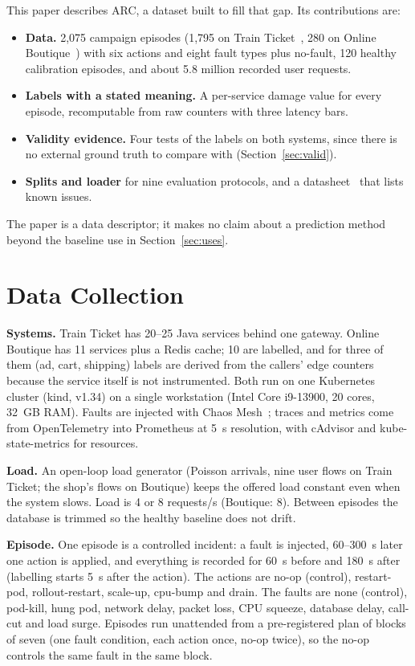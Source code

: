 \documentclass[10pt,conference]{IEEEtran}
\begin{document}
This paper describes ARC, a dataset built to fill that gap. Its contributions are:
\begin{itemize}
\item \textbf{Data.} 2{,}075 campaign episodes (1{,}795 on Train Ticket~\cite{trainticket}, 280 on Online Boutique~\cite{boutique}) with six actions and eight fault types plus no-fault, 120 healthy calibration episodes, and about 5.8 million recorded user requests.
\item \textbf{Labels with a stated meaning.} A per-service damage value for every episode, recomputable from raw counters with three latency bars.
\item \textbf{Validity evidence.} Four tests of the labels on both systems, since there is no external ground truth to compare with (Section~\ref{sec:valid}).
\item \textbf{Splits and loader} for nine evaluation protocols, and a datasheet~\cite{gebru} that lists known issues.
\end{itemize}
The paper is a data descriptor; it makes no claim about a prediction method beyond the baseline use in Section~\ref{sec:uses}.

\section{Data Collection}
\textbf{Systems.} Train Ticket has 20--25 Java services behind one gateway. Online Boutique has 11 services plus a Redis cache; 10 are labelled, and for three of them (ad, cart, shipping) labels are derived from the callers' edge counters because the service itself is not instrumented. Both run on one Kubernetes cluster (kind, v1.34) on a single workstation (Intel Core i9-13900, 20 cores, 32~GB RAM). Faults are injected with Chaos Mesh~\cite{chaosmesh}; traces and metrics come from OpenTelemetry into Prometheus at 5~s resolution, with cAdvisor and kube-state-metrics for resources.

\textbf{Load.} An open-loop load generator (Poisson arrivals, nine user flows on Train Ticket; the shop's flows on Boutique) keeps the offered load constant even when the system slows. Load is 4 or 8 requests/s (Boutique: 8). Between episodes the database is trimmed so the healthy baseline does not drift.

\textbf{Episode.} One episode is a controlled incident: a fault is injected, 60--300~s later one action is applied, and everything is recorded for 60~s before and 180~s after (labelling starts 5~s after the action). The actions are no-op (control), restart-pod, rollout-restart, scale-up, cpu-bump and drain. The faults are none (control), pod-kill, hung pod, network delay, packet loss, CPU squeeze, database delay, call-cut and load surge. Episodes run unattended from a pre-registered plan of blocks of seven (one fault condition, each action once, no-op twice), so the no-op controls the same fault in the same block.
\end{document}

